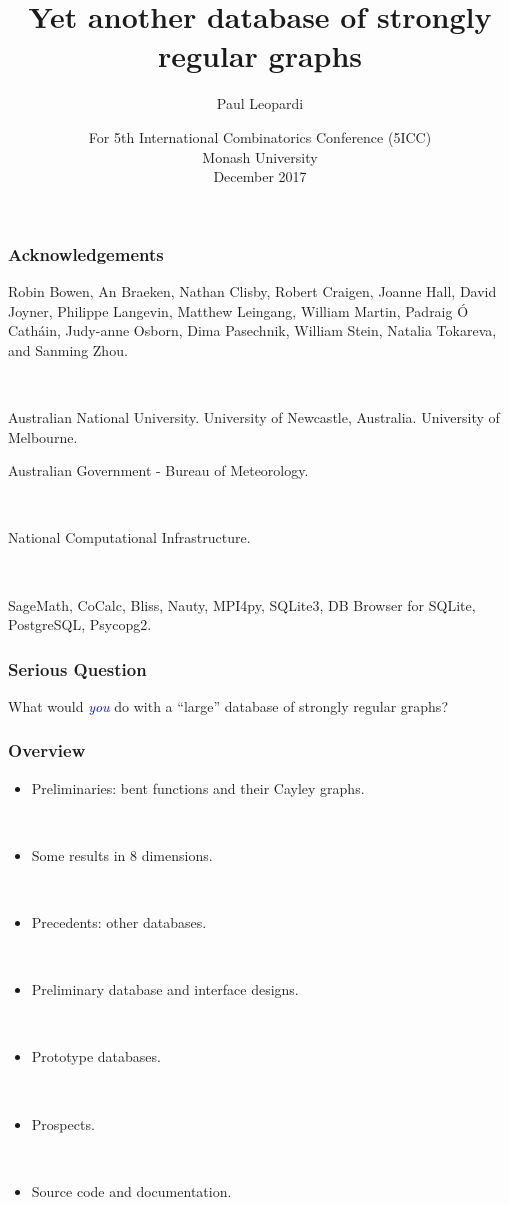 \documentclass[pdf,sprung,slideColor,nocolorBG]{beamer}
\title{Yet another database of strongly regular graphs}
\author{Paul Leopardi}
\date{For 5th International Combinatorics Conference (5ICC)
\\
Monash University
\\
December 2017}
\institute{University of Melbourne
\\
Australian Government - Bureau of Meteorology}
\newcommand{\Emph}[1]{\emph{\textcolor{blue}{#1}}}
\begin{document}
\frame{\titlepage}
\begin{frame}
\frametitle{Acknowledgements}
\begin{center}
Robin Bowen,
An Braeken,
Nathan Clisby,
Robert Craigen,
Joanne Hall,
David Joyner,
Philippe Langevin,
Matthew Leingang,
William Martin,
Padraig {\'O} Cath{\'a}in,
Judy-anne Osborn,
Dima Pasechnik,
William Stein,
Natalia Tokareva, and
Sanming Zhou.

~

Australian National University. University of Newcastle, Australia. University of Melbourne.

Australian Government - Bureau of Meteorology.

~

National Computational Infrastructure.

~

SageMath, CoCalc, Bliss, Nauty, MPI4py, SQLite3, DB Browser for SQLite, PostgreSQL, Psycopg2.
\end{center}
\end{frame}

\begin{frame}
\frametitle{Serious Question}
\begin{center}
\vspace{+10mm}
\large{}
What would \Emph{you} do with a ``large'' database of strongly regular graphs?
\normalsize{}
\end{center}
\end{frame}

\begin{frame}
\frametitle{Overview}
\begin{itemize}
\item
Preliminaries: bent functions and their Cayley graphs.

~

\item
Some results in 8 dimensions.

~

\item
Precedents: other databases.

~

\item
Preliminary database and interface designs.

~

\item
Prototype databases.

~

\item
Prospects.

~

\item
Source code and documentation.
\end{itemize}

\end{frame}
\end{document}
